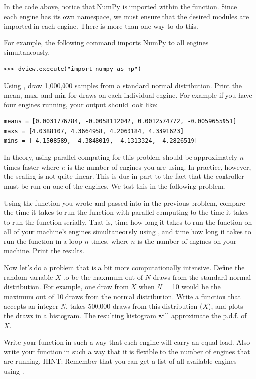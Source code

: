 \begin{info}
In the code above, notice that NumPy is imported within the function. 
Since each engine has its own namespace, we must ensure that the desired modules are imported in each engine.
There is more than one way to do this. 

For example, the following command imports NumPy to all engines simultaneously.

\begin{lstlisting}
>>> dview.execute("import numpy as np")
\end{lstlisting}
\end{info}

\begin{problem}
Using , draw 1,000,000 samples from a standard normal distribution. Print the mean, max, and min for draws on each individual engine. For example if you have four engines running, your output should look like:
\begin{lstlisting}
means = [0.0031776784, -0.0058112042, 0.0012574772, -0.0059655951]
maxs = [4.0388107, 4.3664958, 4.2060184, 4.3391623]
mins = [-4.1508589, -4.3848019, -4.1313324, -4.2826519]
\end{lstlisting}
\end{problem}

In theory, using parallel computing for this problem should be approximately $n$ times faster where $n$ is the number of engines you are using.
In practice, however, the scaling is not quite linear.
This is due in part to the fact that the controller must be run on one of the engines.
We test this in the following problem.

\begin{problem}
Using the function you wrote and passed into  in the previous problem, compare the time it takes to run the function with parallel computing to the time it takes to run the function serially.
That is, time how long it takes to run the function on all of your machine's engines simultaneously using , and time how long it takes to run the function in a  loop $n$ times, where $n$ is the number of engines on your machine. 
Print the results.
\end{problem}

\begin{problem}
Now let's do a problem that is a bit more computationally intensive. 
Define the random variable $X$ to be the maximum out of $N$ draws from the standard normal distribution.
For example, one draw from $X$ when $N$ = 10 would be the maximum out of 10 draws from the normal distribution.
Write a function that accepts an integer $N$, takes 500,000 draws from this distribution ($X$), and plots the draws in a histogram.
The resulting histogram will approximate the p.d.f. of $X$.

Write your function in such a way that each engine will carry an equal load. Also write your function in such a way that it is flexible to the number of engines that are running. HINT: Remember that you can get a list of all available engines using .
\end{problem}

